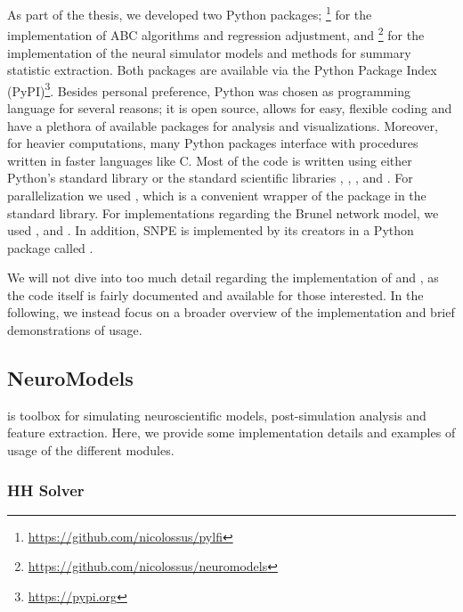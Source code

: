 As part of the thesis, we developed two Python packages; \footnote{\url{https://github.com/nicolossus/pylfi}} for the implementation of ABC algorithms and regression adjustment, and \footnote{\url{https://github.com/nicolossus/neuromodels}} for the implementation of the neural simulator models and methods for summary statistic extraction. Both packages are available via the Python Package Index (PyPI)\footnote{\url{https://pypi.org}}. Besides personal preference, Python was chosen as programming language for several reasons; it is open source, allows for easy, flexible coding and have a plethora of available packages for analysis and visualizations. Moreover, for heavier computations, many Python packages interface with procedures written in faster languages like C. Most of the code is written using either Python's standard library or the standard scientific libraries  \cite{numpy},  \cite{scipy},  \cite{matplotlib},  \cite{pandas} and  \cite{seaborn}. For parallelization we used  \cite{pathos}, which is a convenient wrapper of the  package in the standard library. For implementations regarding the Brunel network model, we used  \cite{nest},  \cite{neo} and  \cite{elephant}. In addition, SNPE is implemented by its creators in a Python package called  \cite{sbi}. 

We will not dive into too much detail regarding the implementation of  and , as the code itself is fairly documented and available for those interested. In the following, we instead focus on a broader overview of the implementation and brief demonstrations of usage.

\subsection{NeuroModels}\label{sec:neuromodels}

 is toolbox for simulating neuroscientific models, post-simulation analysis and feature extraction. Here, we provide some implementation details and examples of usage of the different modules. 

\subsubsection*{HH Solver}

